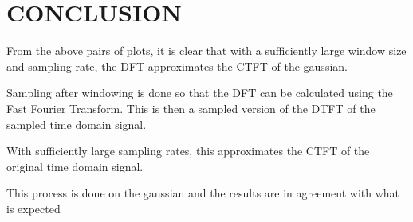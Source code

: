 \documentclass[11pt, a4paper]{article}
\begin{document}
\section{CONCLUSION}
From the above pairs of plots, it is clear that with a sufficiently large window size and sampling
rate, the DFT approximates the CTFT of the gaussian.

 Sampling after windowing is done so that the DFT can be calculated using the Fast Fourier
Transform. This is then a sampled version of the DTFT of the sampled time domain signal.

With sufficiently large sampling rates, this approximates the CTFT of the original time
domain signal.

This process is done on the gaussian and the results are in agreement with what is expected
\end{document}
